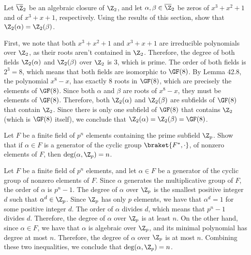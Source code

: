 \begin{problem}[42.9]
  Let $\overline{\Z}_2$ be an algebraic closure of $\Z_2$, and let $\alpha, \beta \in \overline{\Z}_2$ be zeros of $x^3 + x^2 + 1$ and of $x^3 + x + 1$, respectively. Using the results of this section, show that $\Z_2(\alpha) = \Z_2(\beta)$.
\end{problem}

\begin{solution}
  First, we note that both $x^3 + x^2 + 1$ and $x^3 + x + 1$ are irreducible polynomials over $\Z_2$, as their roots aren't contained in $\Z_2$. Therefore, the degree of both fields $\Z_2(\alpha)$ and $\Z_2(\beta)$ over $\Z_2$ is 3, which is prime. The order of both fields is $2^3 = 8$, which means that both fields are isomorphic to $\GF(8)$. By Lemma 42.8, the polynomial $x^8 - x$, has exactly 8 roots in $\GF(8)$, which are precisely the elements of $\GF(8)$. Since both $\alpha$ and $\beta$ are roots of $x^8 - x$, they must be elements of $\GF(8)$. Therefore, both $\Z_2(\alpha)$ and $\Z_2(\beta)$ are subfields of $\GF(8)$ that contain $\Z_2$. Since there is only one subfield of $\GF(8)$ that contains $\Z_2$ (which is $\GF(8)$ itself), we conclude that $\Z_2(\alpha) = \Z_2(\beta) = \GF(8)$.
\end{solution}

\begin{problem}[42.11]
  Let $F$ be a finite field of $p^n$ elements containing the prime subfield $\Z_p$. Show that if $\alpha \in F$ is a generator of the cyclic group $\braket{F^*, \cdot}$, of nonzero elements of $F$, then $\deg(\alpha, \Z_p) = n$.
\end{problem}

\begin{solution}
  Let $F$ be a finite field of $p^n$ elements, and let $\alpha \in F$ be a generator of the cyclic group of nonzero elements of $F$. Since $\alpha$ generates the multiplicative group of $F$, the order of $\alpha$ is $p^n - 1$. The degree of $\alpha$ over $\Z_p$ is the smallest positive integer $d$ such that $\alpha^d \in \Z_p$. Since $\Z_p$ has only $p$ elements, we have that $\alpha^d = 1$ for some positive integer $d$. The order of $\alpha$ divides $d$, which means that $p^n - 1$ divides $d$. Therefore, the degree of $\alpha$ over $\Z_p$ is at least $n$. On the other hand, since $\alpha \in F$, we have that $\alpha$ is algebraic over $\Z_p$, and its minimal polynomial has degree at most $n$. Therefore, the degree of $\alpha$ over $\Z_p$ is at most $n$. Combining these two inequalities, we conclude that $\deg(\alpha, \Z_p) = n$.
\end{solution}

